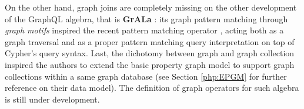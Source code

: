 On the other hand, graph joins are completely missing on the other development of the GraphQL algebra, that is \textbf{GrALa} \cite{apacheflink}: its graph pattern matching through \textit{graph motifs} inspired the recent pattern matching operator \cite{JunghannsKAPR17}, acting both as a graph traversal and as a proper pattern matching query interpretation on top of Cypher's query syntax. Last, the dichotomy between graph and graph collection inspired the authors to extend the basic property graph model to support graph collections within a same graph database (see Section \ref{php:EPGM} for further reference on their data model). The definition of graph operators for such algebra is still under development.
